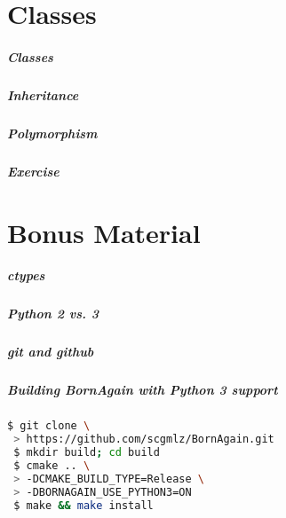 \documentclass[hyperref={colorlinks, linkcolor=blue, urlcolor=blue}]{beamer}
\begin{document}
\part{Classes} 

\begin{frame}
  \frametitle{Classes}
\end{frame}

\begin{frame}
  \frametitle{Inheritance}
\end{frame}

\begin{frame}
  \frametitle{Polymorphism}
\end{frame}

\begin{frame}
  \frametitle{Exercise}
\end{frame}


\part{Bonus Material} 

\begin{frame}
  \frametitle{ctypes}
\end{frame}

\begin{frame}
  \frametitle{Python 2 vs. 3}
\end{frame}

\begin{frame}
  \frametitle{git and github}
\end{frame}

\begin{frame}[fragile]
  \frametitle{Building BornAgain with Python 3 support}
    \begin{lstlisting}[language=bash]
 $ git clone \
 > https://github.com/scgmlz/BornAgain.git
 $ mkdir build; cd build
 $ cmake .. \
 > -DCMAKE_BUILD_TYPE=Release \
 > -DBORNAGAIN_USE_PYTHON3=ON
 $ make && make install
    \end{lstlisting}



\end{frame}


\end{document}
